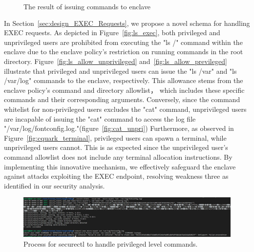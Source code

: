 \begin{figure}[!htb]
    
    \caption[The result of issuing  commands to enclave]{The result of issuing  commands to enclave\label{fig:exec}}
\end{figure}


In Section~\ref*{sec:design_EXEC_Requests}, we propose a novel schema for handling EXEC requests. As depicted in Figure~\ref{fig:ls_exec}, both privileged and unprivileged users are prohibited from executing the "ls /" command within the enclave due to the enclave policy's restriction on running commands in the root directory. 
Figure~\ref{fig:ls_allow_unprivileged} and~\ref{fig:ls_allow_previleged} illustrate that privileged and unprivileged users can issue the "ls /var" and "ls /var/log" commands to the enclave, respectively. This allowance stems from the enclave policy's command and directory allowlist， which includes these specific commands and their corresponding arguments. 
Conversely, since the command whitelist for non-privileged users excludes the "cat" command, unprivileged users are incapable of issuing the "cat" command to access the log file "/var/log/fontconfig.log."(figure~\ref{fig:cat_unpri}) 
Furthermore, as observed in Figure~\ref{fig:cquark_terminal},  privileged users can spawn a terminal, while unprivileged users cannot. 
This is as expected since the unprivileged user's command allowlist does not include any terminal allocation instructions. By implementing this innovative mechanism, we effectively safeguard the enclave against attacks exploiting the EXEC endpoint, resolving weakness three as identified in our security analysis.


\begin{figure}[!htb]
    \centering
    \includegraphics[width=1\textwidth]{images/cquark_priviled_cmd_result_protection.PNG}
    \caption[Process for securectl to handle privileged level commands]{Process for securectl to handle privileged level commands.}
    \label{fig:cquark_priviled_cmd_result_protection}
\end{figure}



